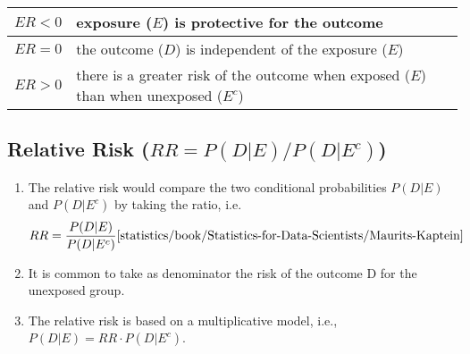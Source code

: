 \begin{customArrayStretch}{1.2}
    \begin{table}[H]
        \centering
        \begin{tabular}{|c|p{14cm}|}
            \hline

            $ER < 0$ & exposure ($E$) is protective for the outcome
            \cite{statistics/book/Statistics-for-Data-Scientists/Maurits-Kaptein} \\
            \hline

            $ER = 0$ & the outcome ($D$) is independent of the exposure ($E$)
            \cite{statistics/book/Statistics-for-Data-Scientists/Maurits-Kaptein} \\
            \hline

            $ER > 0$ & there is a greater risk of the outcome when exposed ($E$) than when unexposed ($E^c$)
            \cite{statistics/book/Statistics-for-Data-Scientists/Maurits-Kaptein} \\
            \hline
        \end{tabular}
    \end{table}
\end{customArrayStretch}




\subsection{Relative Risk ($RR = {P(D|E)}/{P(D|E^c)}$)}

\begin{enumerate}
    \item The relative risk would compare the two conditional probabilities $P (D|E)$ and $P (D|E^c)$ by taking the ratio, i.e.
    \hfill \cite{statistics/book/Statistics-for-Data-Scientists/Maurits-Kaptein}
    \[
        RR = \dfrac{P(D|E)}{P(D|E^c)}
        \hfill \text{\cite{statistics/book/Statistics-for-Data-Scientists/Maurits-Kaptein}}
    \]

    \item It is common to take as denominator the risk of the outcome D for the unexposed group.
    \hfill \cite{statistics/book/Statistics-for-Data-Scientists/Maurits-Kaptein}

    \item The relative risk is based on a multiplicative model, i.e., $P (D|E) = RR \cdot P (D|E^c)$.
\end{enumerate}



